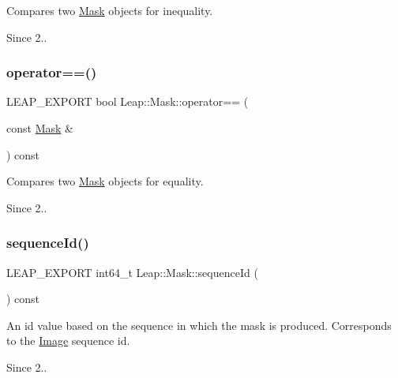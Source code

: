 Compares two \hyperlink{class_leap_1_1_mask}{Mask} objects for inequality. \begin{DoxySince}{Since}
2.. 
\end{DoxySince}
\mbox{\label{class_leap_1_1_mask_aa2daf5211ff234c895b9f9564dc7374a}} 
\subsubsection{\texorpdfstring{operator==()}{operator==()}}
{\footnotesize\ttfamily L\+E\+A\+P\+\_\+\+E\+X\+P\+O\+RT bool Leap\+::\+Mask\+::operator== (\begin{DoxyParamCaption}\item[{const \hyperlink{class_leap_1_1_mask}{Mask} \&}]{ }\end{DoxyParamCaption}) const}

Compares two \hyperlink{class_leap_1_1_mask}{Mask} objects for equality. \begin{DoxySince}{Since}
2.. 
\end{DoxySince}
\mbox{\label{class_leap_1_1_mask_af4a05e08d5b18f8b4bfd02d3ba249fc5}} 
\subsubsection{\texorpdfstring{sequence\+Id()}{sequenceId()}}
{\footnotesize\ttfamily L\+E\+A\+P\+\_\+\+E\+X\+P\+O\+RT int64\+\_\+t Leap\+::\+Mask\+::sequence\+Id (\begin{DoxyParamCaption}{ }\end{DoxyParamCaption}) const}

An id value based on the sequence in which the mask is produced. Corresponds to the \hyperlink{class_leap_1_1_image}{Image} sequence id. 
\begin{DoxyCodeInclude}
\end{DoxyCodeInclude}
 \begin{DoxySince}{Since}
2.. 
\end{DoxySince}
\mbox{\label{class_leap_1_1_mask_af452cfeac9999ea09b9a5277dcfc150f}} 
